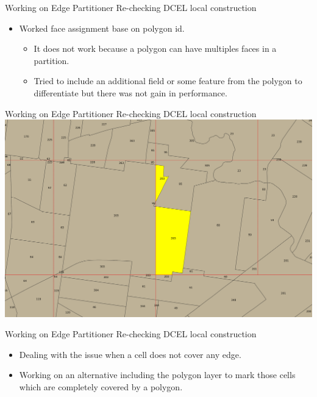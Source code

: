 \documentclass{beamer}
\begin{document}
\begin{frame}{Working on Edge Partitioner}
{Re-checking DCEL local construction}
    \begin{itemize}
        \item Worked face assignment base on polygon id.
        \begin{itemize}
            \item It does not work because a polygon can have multiples faces in a partition.
            \item Tried to include an additional field or some feature from the polygon to differentiate but there was not gain in performance.
        \end{itemize}
    \end{itemize}
\end{frame}

\begin{frame}{Working on Edge Partitioner}
{Re-checking DCEL local construction}
    \centering 
    \includegraphics[width=0.8\linewidth]{figures/CA_Faces}     
\end{frame}

\begin{frame}{Working on Edge Partitioner}
{Re-checking DCEL local construction}
    \begin{itemize}
        \item Dealing with the issue when a cell does not cover any edge.
        \item Working on an alternative including the polygon layer to mark those cells which are completely covered by a polygon.
    \end{itemize}
\end{frame}
\end{document}
